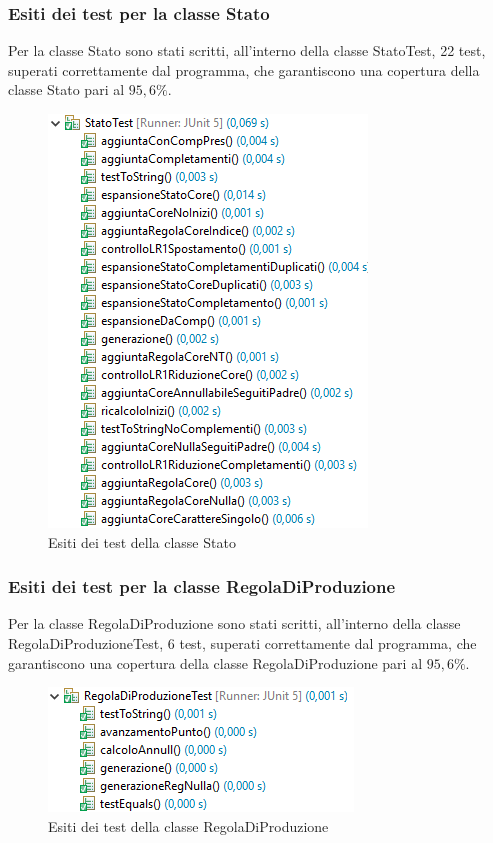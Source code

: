 \documentclass[12pt]{article}
\begin{document}
\subsubsection{Esiti dei test per la classe Stato}
Per la classe Stato sono stati scritti, all'interno della classe StatoTest, 22 test, superati correttamente dal programma, che garantiscono una copertura della classe Stato pari al $95,6\%$.
\begin{figure}[h]
\centering
\includegraphics[scale=0.9]{immagini/esitiStatoTest.png}
\caption{Esiti dei test della classe Stato}
\end{figure}
\subsubsection{Esiti dei test per la classe RegolaDiProduzione}
Per la classe RegolaDiProduzione sono stati scritti, all'interno della classe RegolaDiProduzioneTest, 6 test, superati correttamente dal programma, che garantiscono una copertura della classe RegolaDiProduzione pari al $95,6\%$.
\begin{figure}[h]
\centering
\includegraphics[scale=0.9]{immagini/esitiRegolaDiProduzioneTest.png}
\caption{Esiti dei test della classe RegolaDiProduzione}
\end{figure}
\end{document}
